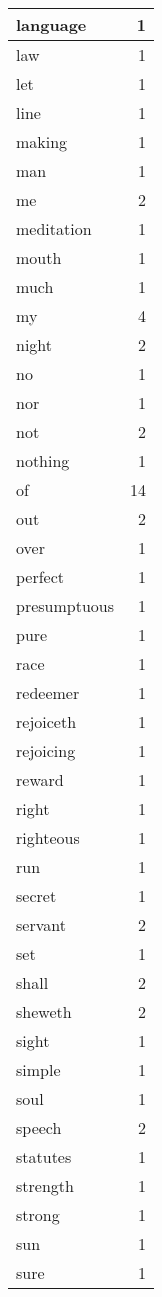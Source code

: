\begin{center}
\begin{longtable}{l|r}
language & 1 \\ \hline
law & 1 \\ \hline
let & 1 \\ \hline
line & 1 \\ \hline
making & 1 \\ \hline
man & 1 \\ \hline
me & 2 \\ \hline
meditation & 1 \\ \hline
mouth & 1 \\ \hline
much & 1 \\ \hline
my & 4 \\ \hline
night & 2 \\ \hline
no & 1 \\ \hline
nor & 1 \\ \hline
not & 2 \\ \hline
nothing & 1 \\ \hline
of & 14 \\ \hline
out & 2 \\ \hline
over & 1 \\ \hline
perfect & 1 \\ \hline
presumptuous & 1 \\ \hline
pure & 1 \\ \hline
race & 1 \\ \hline
redeemer & 1 \\ \hline
rejoiceth & 1 \\ \hline
rejoicing & 1 \\ \hline
reward & 1 \\ \hline
right & 1 \\ \hline
righteous & 1 \\ \hline
run & 1 \\ \hline
secret & 1 \\ \hline
servant & 2 \\ \hline
set & 1 \\ \hline
shall & 2 \\ \hline
sheweth & 2 \\ \hline
sight & 1 \\ \hline
simple & 1 \\ \hline
soul & 1 \\ \hline
speech & 2 \\ \hline
statutes & 1 \\ \hline
strength & 1 \\ \hline
strong & 1 \\ \hline
sun & 1 \\ \hline
sure & 1 \\ \hline

\end{longtable}
\end{center}
